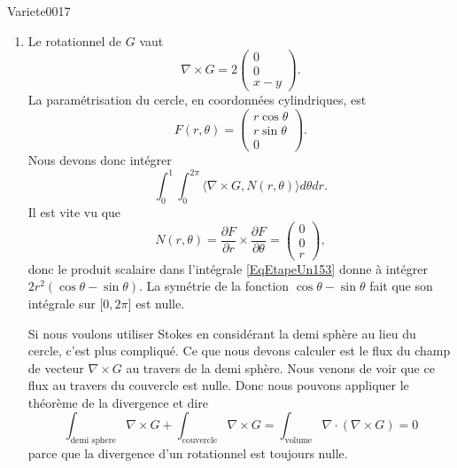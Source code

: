 \begin{corrige}{Variete0017}
\begin{enumerate}
		\item
			Le rotationnel de $G$ vaut
			\begin{equation}
				\nabla\times G=2\begin{pmatrix}
					0	\\ 
					0	\\ 
					x-y	
				\end{pmatrix}.
			\end{equation}
			La paramétrisation du cercle, en coordonnées cylindriques, est
			\begin{equation}
				F(r,\theta)=\begin{pmatrix}
					r\cos\theta	\\ 
					r\sin\theta	\\ 
					0	
				\end{pmatrix}.
			\end{equation}
			Nous devons donc intégrer
			\begin{equation}		\label{EqEtapeUn153}
				\int_0^1\int_0^{2\pi} \langle \nabla\times G, N(r,\theta)\rangle   d\theta dr.
			\end{equation}
			Il est vite vu que
			\begin{equation}
				N(r,\theta)=\frac{ \partial F }{ \partial r }\times\frac{ \partial F }{ \partial \theta }=\begin{pmatrix}
					0	\\ 
					0	\\ 
					r	
				\end{pmatrix},
			\end{equation}
			donc le produit scalaire dans l'intégrale \eqref{EqEtapeUn153} donne à intégrer $2r^2(\cos\theta-\sin\theta)$. La symétrie de la fonction $\cos\theta-\sin\theta$ fait que son intégrale sur $\mathopen[ 0 , 2\pi \mathclose]$ est nulle.

			Si nous voulons utiliser Stokes en considérant la demi sphère au lieu du cercle, c'est plus compliqué. Ce que nous devons calculer est le flux du champ de vecteur $\nabla\times G$ au travers de la demi sphère. Nous venons de voir que ce flux au travers du \og couvercle\fg{} est nulle. Donc nous pouvons appliquer le théorème de la divergence et dire
			\begin{equation}
				\int_{\text{demi sphere}}\nabla\times G+\int_{\text{couvercle}}\nabla\times G=\int_{\text{volume}}\nabla\cdot(\nabla\times G)=0
			\end{equation}
			parce que la divergence d'un rotationnel est toujours nulle.


\end{enumerate}
\end{corrige}
